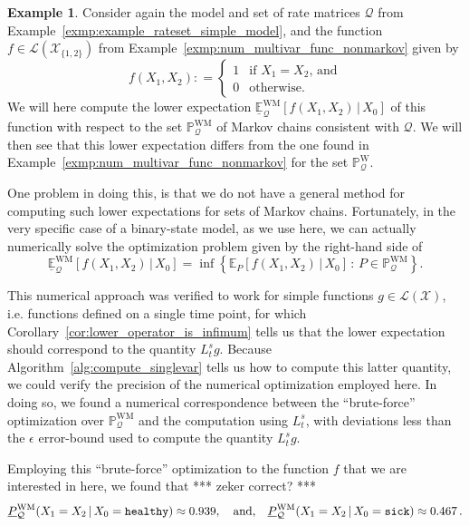 \documentclass[10pt,a4paper]{paper}
\theoremstyle{definition}
\newtheorem{exmp}{Example}%
\newcommand{\states}{\mathcal{X}}
\newcommand{\processes}{\mathbb{P}}
\newcommand{\wprocesses}{\processes^{\mathrm{W}}}
\newcommand{\wmprocesses}{\processes^{\mathrm{WM}}}
\newcommand{\gambles}{\mathcal{L}}
\newcommand{\gamblesX}{\gambles(\states)}
\newcommand{\rateset}{\mathcal{Q}}
\newcommand{\coloneqq}{:\!=}
\begin{document}
\begin{exmp} \label{exmp:num_counterexample_markov}
Consider again the model and set of rate matrices $\rateset$ from Example~\ref{exmp:example_rateset_simple_model}, and the function $f\in\gambles(\states_{\{1,2\}})$ from Example~\ref{exmp:num_multivar_func_nonmarkov} given by
\begin{equation*}
f(X_1,X_2) \coloneqq \left\{\begin{array}{ll}
1 & \text{if $X_1 = X_2$, and} \\
0 & \text{otherwise.}
\end{array}\right.
\end{equation*}
We will here compute the lower expectation $\underline{\mathbb{E}}_\rateset^{\mathrm{WM}}[f(X_1,X_2)\,\vert\,X_0]$ of this function with respect to the set $\wmprocesses_\rateset$ of Markov chains consistent with $\rateset$. We will then see that this lower expectation differs from the one found in Example~\ref{exmp:num_multivar_func_nonmarkov} for the set $\wprocesses_\rateset$.

One problem in doing this, is that we do not have a general method for computing such lower expectations for sets of Markov chains. Fortunately, in the very specific case of a binary-state model, as we use here, we can actually numerically solve the optimization problem given by the right-hand side of
\begin{equation*}
\underline{\mathbb{E}}_\rateset^{\mathrm{WM}}[f(X_1,X_2)\,\vert\,X_0] = \inf\left\{ \mathbb{E}_P[f(X_1,X_2)\,\vert\,X_0]\,:\,P\in\wmprocesses_\rateset\right\}.
\end{equation*}

This numerical approach was verified to work for simple functions $g\in\gamblesX$, i.e. functions defined on a single time point, for which Corollary~\ref{cor:lower_operator_is_infimum} tells us that the lower expectation should correspond to the quantity $L_t^sg$. Because Algorithm~\ref{alg:compute_singlevar} tells us how to compute this latter quantity, we could verify the precision of the numerical optimization employed here. In doing so, we found a numerical correspondence between the ``brute-force'' optimization over $\wmprocesses_\rateset$ and the computation using $L_t^s$, with deviations less than the $\epsilon$ error-bound used to compute the quantity $L_t^sg$.

Employing this ``brute-force'' optimization to the function $f$ that we are interested in here, we found that *** zeker correct? ***
\begin{align*}
\underline{P}_{\rateset}^{\mathrm{WM}}(X_1 = X_2\,\vert\,X_0=\text{{\tt healthy}}) \approx 0.939,\quad\text{and,}\quad \underline{P}_{\rateset}^{\mathrm{WM}}(X_1 = X_2\,\vert\,X_0=\text{{\tt sick}}) \approx 0.467\,.
\end{align*}


\end{exmp}
\end{document}
